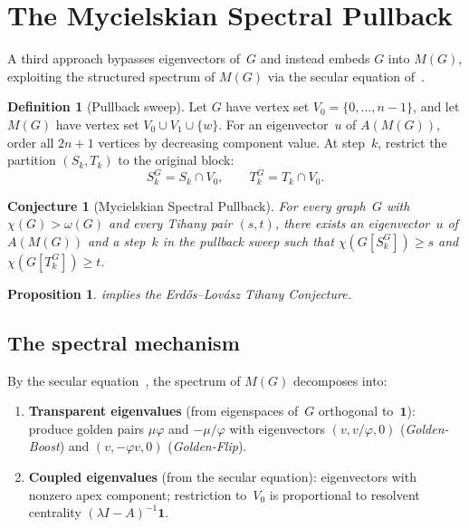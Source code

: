\documentclass[11pt]{amsart}
\newtheorem{proposition}[theorem]{Proposition}
\newtheorem{conjecture}[theorem]{Conjecture}
\theoremstyle{definition}
\newtheorem{definition}[theorem]{Definition}
\theoremstyle{remark}
\newcommand{\vphi}{\varphi}
\begin{document}
\section{The Mycielskian Spectral Pullback}\label{sec:pullback}

A third approach bypasses eigenvectors of~$G$ and instead embeds 
$G$ into $M(G)$, exploiting the structured spectrum of $M(G)$ 
via the secular equation of~\cite{santos-grt-2026}.

\begin{definition}[Pullback sweep]\label{def:pullback}
Let $G$ have vertex set $V_0 = \{0,\ldots,n-1\}$, and let $M(G)$ 
have vertex set $V_0 \cup V_1 \cup \{w\}$.  For an eigenvector~$u$ 
of $A(M(G))$, order all $2n+1$ vertices by decreasing component value.  
At step~$k$, restrict the partition $(S_k, T_k)$ to the original block:
\[
  S_k^G = S_k \cap V_0, \qquad T_k^G = T_k \cap V_0.
\]
\end{definition}

\begin{conjecture}[Mycielskian Spectral Pullback]
\label{conj:pullback}
For every graph~$G$ with $\chi(G) > \omega(G)$ and every Tihany pair 
$(s,t)$, there exists an eigenvector~$u$ of $A(M(G))$ and a step~$k$ 
in the pullback sweep such that 
$\chi(G[S_k^G]) \ge s$ and $\chi(G[T_k^G]) \ge t$.
\end{conjecture}

\begin{proposition}\label{prop:pullback-implies}
 implies the Erd\H{o}s--Lov\'asz Tihany 
Conjecture.
\end{proposition}

\subsection{The spectral mechanism}

By the secular equation~\cite[Theorem~4.1]{santos-grt-2026}, the 
spectrum of $M(G)$ decomposes into:

\begin{enumerate}[label=(\alph*)]
\item \textbf{Transparent eigenvalues} (from eigenspaces of~$G$ 
  orthogonal to~$\mathbf{1}$): produce golden pairs $\mu\vphi$ and 
  $-\mu/\vphi$ with eigenvectors $(v, v/\vphi, 0)$ 
  (\emph{Golden-Boost}) and $(v, -\vphi v, 0)$ (\emph{Golden-Flip}).

\item \textbf{Coupled eigenvalues} (from the secular equation): 
  eigenvectors with nonzero apex component; restriction to~$V_0$ is 
  proportional to resolvent centrality $(\lambda I - A)^{-1}\mathbf{1}$.
\end{enumerate}
\end{document}
